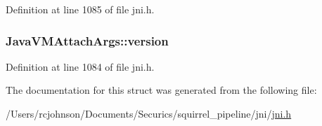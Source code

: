 Definition at line 1085 of file jni.\-h.

\hypertarget{struct_java_v_m_attach_args_a8759e4d59cc61c1d396438e3cc3f0f07}{
\subsubsection[{version}]{ Java\-V\-M\-Attach\-Args\-::version}}\label{struct_java_v_m_attach_args_a8759e4d59cc61c1d396438e3cc3f0f07}


Definition at line 1084 of file jni.\-h.



The documentation for this struct was generated from the following file\-:\begin{DoxyCompactItemize}
\item 
/\-Users/rcjohnson/\-Documents/\-Securics/squirrel\-\_\-pipeline/jni/\hyperlink{jni_8h}{jni.\-h}\end{DoxyCompactItemize}
